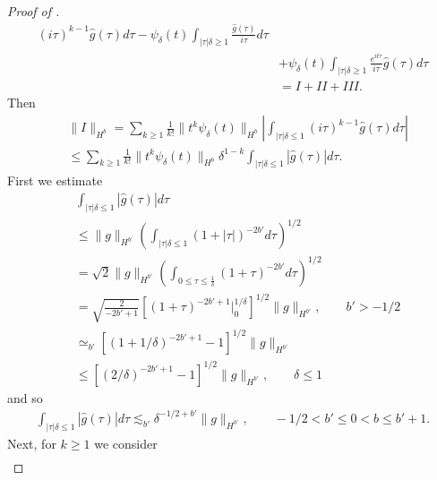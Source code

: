 \documentclass[12pt,reqno]{amsart}
\numberwithin{equation}{section}  %
\renewcommand{\cref}{\Cref}
\newcommand{\wh}{\widehat}
\begin{document}
\begin{appendices}
\begin{proof}[Proof of \cref{lem:pre-bilin-est}]
\begin{equation*}
\begin{split}
  (i\tau)^{k-1} \wh{g}(\tau) d \tau
  - \psi_{\delta}(t) \int_{| \tau |\delta \ge 1}\frac{\wh{g}(\tau)}{i \tau} d \tau
  \\
  & + \psi_{\delta}(t) \int_{| \tau |\delta \ge 1}
  \frac{e^{it \tau}}{i \tau}\wh{g}(\tau) d \tau
  \\
  & = I + II + III.
\end{split}
\end{equation*}
%
%
Then
%
%
\begin{equation}
  \label{h1-norm}
\begin{split}
  & \|I \|_{H^{b}} = \sum_{k \ge 1} \frac{1}{k!} \| t^{k} \psi_{\delta}(t) \|_{H^{b}}
  | \int_{| \tau |\delta \le 1} (i \tau)^{k-1} \wh{g}(\tau) d \tau |
  \\
  & \le \sum_{k \ge 1} \frac{1}{k!} \|t^{k} \psi_{\delta}(t)\|_{H^{b}} \delta^{1-k}\int_{| \tau |\delta \le
  1} | \wh{g}(\tau) | d \tau.
\end{split}
\end{equation}
%
%
%
%
First we estimate
%
%
\begin{equation*}
  \begin{split}
  & \int_{| \tau |\delta \le 1}| \wh{g}(\tau) | d \tau
  \\
  & \le  \| g \|_{H^{b'}} \left( \int_{| \tau | \delta \le 1}  (1 + | \tau
  |)^{-2b'} d \tau \right)^{1/2} 
  \\
  & = \sqrt{2} \| g \|_{H^{b'}} \left( \int_{0 \le \tau \le
  \frac{1}{\delta}}(1 + \tau)^{-2b'} d \tau \right)^{1/2}
  \\
  & = \sqrt{\frac{2}{-2b'+1}} \left[ (1 + \tau)^{-2b'+1} \Big |_{0}^{1/\delta}
  \right]^{1/2} \| g \|_{H^{b'}}, \qquad b'>-1/2
  \\
  & \simeq_{b'} \left[ (1 + 1/\delta)^{-2b'+1} - 1 \right]^{1/2} \| g
  \|_{H^{b'}}
  \\
  & \le \left[ (2/\delta)^{-2b'+1} -1 \right]^{1/2} \| g \|_{H^{b'}}, \qquad \delta \le 1
\end{split}
\end{equation*}
and so 
%
%
\begin{equation}
\label{microl-est}
\begin{split}
\int_{| \tau |\delta \le 1}| \wh{g}(\tau) | d \tau
\lesssim_{b'} \delta^{-1/2 + b'} \| g \|_{H^{b'}}, \qquad -1/2 < b' \le 0 < b \le b' +1.
\end{split}
\end{equation}
%
%
Next, for $k \ge 1$ we consider
%
%
\begin{equation}
  \label{1h}
\begin{split}

\end{split}
\end{equation}
\end{proof}
\end{appendices}
\end{document}
